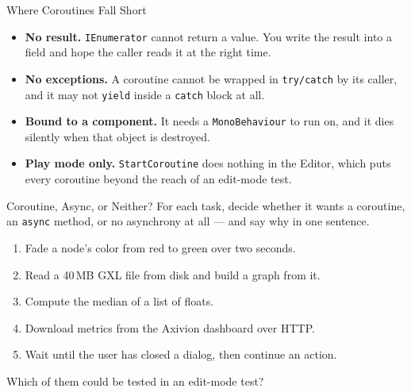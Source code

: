 \begin{frame}{Where Coroutines Fall Short}
  \begin{itemize}
    \item \textbf{No result.} \texttt{IEnumerator} cannot return a value. You
      write the result into a field and hope the caller reads it at the right
      time.
    \item \textbf{No exceptions.} A coroutine cannot be wrapped in
      \texttt{try/catch} by its caller, and it may not \texttt{yield} inside a
      \texttt{catch} block at all.
    \item \textbf{Bound to a component.} It needs a \texttt{MonoBehaviour} to
      run on, and it dies silently when that object is destroyed.
    \item \textbf{Play mode only.} \texttt{StartCoroutine} does nothing in the
      Editor, which puts every coroutine beyond the reach of an edit-mode test.
  \end{itemize}
  \vspace{2ex}

\end{frame}

\begin{exerciseframe}{Coroutine, Async, or Neither?}
  For each task, decide whether it wants a coroutine, an \texttt{async} method,
  or no asynchrony at all --- and say why in one sentence.
  \vspace{1ex}

  \begin{enumerate}
    \item Fade a node's color from red to green over two seconds.
    \item Read a 40\,MB GXL file from disk and build a graph from it.
    \item Compute the median of a list of floats.
    \item Download metrics from the Axivion dashboard over HTTP.
    \item Wait until the user has closed a dialog, then continue an action.
  \end{enumerate}
  \vspace{1ex}

  Which of them could be tested in an edit-mode test?
\end{exerciseframe}

